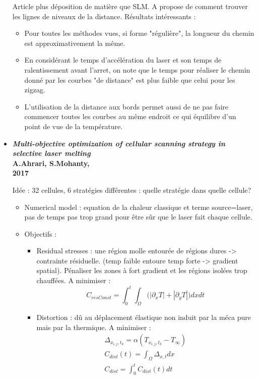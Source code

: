 \documentclass[11pt,a4paper]{article}
\begin{document}
\begin{itemize}
		\vspace{0cm}
		Article plus déposition de matière que SLM. 
		A propose de comment trouver les lignes de niveaux de la distance. Résultats intéressants :
		\begin{itemize}
			\item Pour toutes les méthodes vues, si forme "régulière", la longueur du chemin est approximativement la même. 
			\item En considérant le temps d'accélération du laser et son temps de ralentissement avant l'arret, on note que le temps pour réaliser le chemin donné par les courbes "de distance" est plus faible que celui pour les zigzag.
			\item L'utilisation de la distance aux bords permet aussi de ne pas faire commencer toutes les courbes au même endroit ce qui équilibre d'un point de vue de la température.
		\end{itemize}
	
	\item \textbf{\emph{Multi-objective optimization of cellular scanning strategy in selective laser melting} \\
		A.Ahrari, S.Mohanty, \\
		2017}
	
	\vspace{0cm}
	
	Idée : 32 cellules, 6 stratégies différentes : quelle stratégie dans quelle cellule?
	\begin{itemize}
		\item Numerical model : equation de la chaleur classique et terme source=laser, pas de temps pas trop grand pour être sûr que le laser fait chaque cellule.
		\item Objectifs :
		\begin{itemize}
			\item Residual stresses : une région molle entourée de régions dures -> contrainte résiduelle. (temp faible entoure temp forte -> gradient spatial). Pénaliser les zones à fort gradient et les régions isolées trop chauffées.
			A minimiser :
			\begin{equation}
			C_{resConst}=\int_{0}^{t} \int_{\Omega}\Big(|\partial_xT|+|\partial_yT|\Big)dxdt
			\end{equation}
			
			\item Distortion : dû au déplacement élastique non induit par la méca pure mais par la thermique. A minimiser :
			\begin{equation}
			\begin{array}{l}
			\Delta_{x_{i,j},t_k}=\alpha (T_{x_{i,j},t_k}-T_{\infty})\\
			C_{dist}(t)=\int_{\Omega}\Delta_{x,t}dx\\
			C_{dist}=\int_{0}^{t}C_{dist}(t)dt
			\end{array}
			\end{equation}
			

\end{itemize}
\end{itemize}
\end{itemize}
\end{document}
